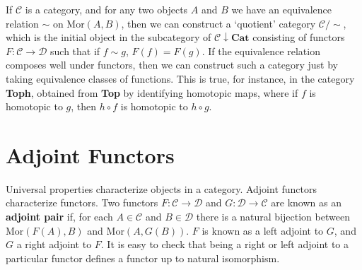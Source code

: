 If $\mathcal{C}$ is a category, and for any two objects $A$ and $B$ we have an equivalence relation $\sim$ on $\text{Mor}(A,B)$, then we can construct a `quotient' category $\mathcal{C}/\sim$, which is the initial object in the subcategory of $\mathcal{C} \downarrow \mathbf{Cat}$ consisting of functors $F: \mathcal{C} \to \mathcal{D}$ such that if $f \sim g$, $F(f) = F(g)$. If the equivalence relation composes well under functors, then we can construct such a category just by taking equivalence classes of functions. This is true, for instance, in the category {\bf Toph}, obtained from {\bf Top} by identifying homotopic maps, where if $f$ is homotopic to $g$, then $h \circ f$ is homotopic to $h \circ g$.




\section{Adjoint Functors}

Universal properties characterize objects in a category. Adjoint functors characterize functors. Two functors $F: \mathcal{C} \to \mathcal{D}$ and $G: \mathcal{D} \to \mathcal{C}$ are known as an {\bf adjoint pair} if, for each $A \in \mathcal{C}$ and $B \in \mathcal{D}$ there is a natural bijection between $\text{Mor}(F(A), B)$ and $\text{Mor}(A,G(B))$. $F$ is known as a left adjoint to $G$, and $G$ a right adjoint to $F$. It is easy to check that being a right or left adjoint to a particular functor defines a functor up to natural isomorphism.

